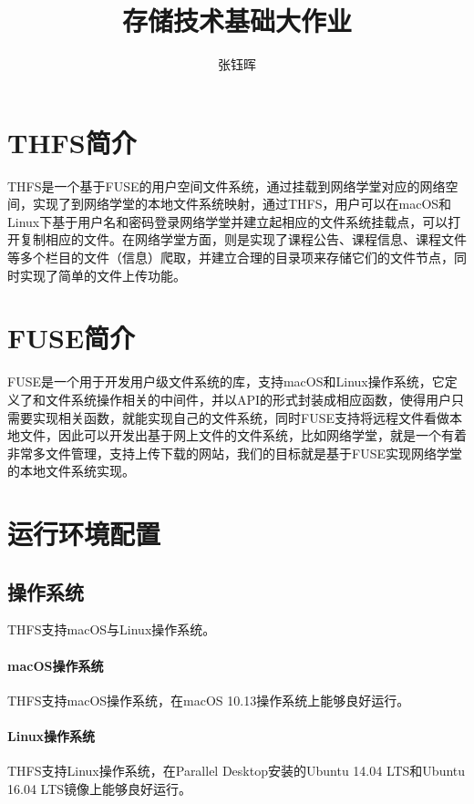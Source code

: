 

\title{存储技术基础大作业}
\author{张钰晖}



 
\maketitle
\tableofcontents
\newpage

\section{THFS简介}

THFS是一个基于FUSE的用户空间文件系统，通过挂载到网络学堂对应的网络空间，实现了到网络学堂的本地文件系统映射，通过THFS，用户可以在macOS和Linux下基于用户名和密码登录网络学堂并建立起相应的文件系统挂载点，可以打开复制相应的文件。在网络学堂方面，则是实现了课程公告、课程信息、课程文件等多个栏目的文件（信息）爬取，并建立合理的目录项来存储它们的文件节点，同时实现了简单的文件上传功能。

\section{FUSE简介}

FUSE是一个用于开发用户级文件系统的库，支持macOS和Linux操作系统，它定义了和文件系统操作相关的中间件，并以API的形式封装成相应函数，使得用户只需要实现相关函数，就能实现自己的文件系统，同时FUSE支持将远程文件看做本地文件，因此可以开发出基于网上文件的文件系统，比如网络学堂，就是一个有着非常多文件管理，支持上传下载的网站，我们的目标就是基于FUSE实现网络学堂的本地文件系统实现。

\section{运行环境配置}

\subsection{操作系统}

THFS支持macOS与Linux操作系统。

\paragraph{macOS操作系统} THFS支持macOS操作系统，在macOS 10.13操作系统上能够良好运行。

\paragraph{Linux操作系统} THFS支持Linux操作系统，在Parallel Desktop安装的Ubuntu 14.04 LTS和Ubuntu 16.04 LTS镜像上能够良好运行。

